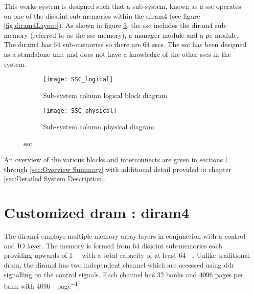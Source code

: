 This works system is designed such that a sub-system, known as a \acf{ssc} operates on one of the disjoint sub-memories within the \ac{diram4} (see figure \ref{fig:diram4Layout}).
As shown in figure \ref{fig:SSC}, the \ac{ssc} includes the \ac{diram4} sub-memory (referred to as the \ac{ssc} memory), a manager module and a \ac{pe} module.
The \ac{diram4} has 64 sub-memories so there are 64 \acp{ssc}. The \ac{ssc} has been designed as a standalone unit and does not have a knowledge of the other \acp{ssc} in the system.
\begin{figure}
\centering
\begin{subfigure}{.44\textwidth}
  \centering
  \texttt{[image: SSC\_logical]}
  \captionsetup{justification=centering, skip=10pt}
  \vspace{-6pt}
  \caption{Sub-system column logical block diagram}
  \label{fig:Sub-system Column Logical Block Diagram}
\end{subfigure}%
\begin{subfigure}{.54\textwidth}
  \centering
  \texttt{[image: SSC\_physical]}
  \captionsetup{justification=centering, skip=10pt}
  \vspace{20pt}
  \caption{Sub-system column physical diagram}
  \label{fig:Sub-system Column Physical Diagram}
\end{subfigure}
\captionsetup{justification=centering, skip=12pt}
\caption{\acf{ssc}}
\label{fig:SSC}
\end{figure}

An overview of the various blocks and interconnects are given in sections \ref{sec:3ddram} through \ref{sec:Overview Summary}
with additional detail provided in chapter \ref{sec:Detailed System Description}.

\section{Customized \ac{dram} : \acf{diram4}}
\label{sec:3ddram}
The \ac{diram4} \cite{tezzaron:diram4} employs multiple memory array layers in conjunction with a control and IO layer.
The memory is formed from 64 disjoint sub-memories each providing upwards of \SI[per-mode=symbol]{1}{\giga\bit} with a total capacity of at least \SI[per-mode=symbol]{64}{\giga\bit}.
Unlike traditional \ac{dram}, the \ac{diram4} has two independent channel which are accessed using \ac{ddr} signalling on the control signals.
Each channel has 32 banks and 4096 pages per bank with \SI[per-mode=symbol]{4096}{\bit\per page}.

